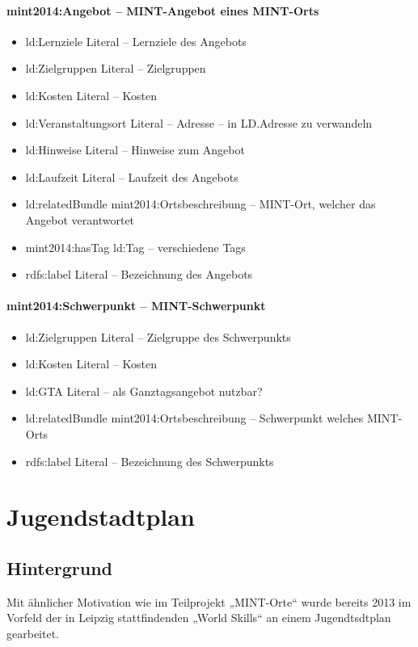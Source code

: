 \documentclass[a4paper,11pt]{article}
\begin{document}
\paragraph{mint2014:Angebot – MINT-Angebot eines MINT-Orts}
\begin{itemize}\itemsep0pt
\item ld:Lernziele Literal – Lernziele des Angebots
\item ld:Zielgruppen Literal – Zielgruppen
\item ld:Kosten Literal – Kosten
\item ld:Veranstaltungsort Literal – Adresse – in LD.Adresse zu verwandeln
\item ld:Hinweise Literal – Hinweise zum Angebot
\item ld:Laufzeit Literal – Laufzeit des Angebots
\item ld:relatedBundle mint2014:Ortsbeschreibung – MINT-Ort, welcher das
  Angebot verantwortet
\item mint2014:hasTag ld:Tag – verschiedene Tags
\item rdfs:label Literal – Bezeichnung des Angebots
\end{itemize}
\paragraph{mint2014:Schwerpunkt – MINT-Schwerpunkt}
\begin{itemize}\itemsep0pt
\item ld:Zielgruppen Literal – Zielgruppe des Schwerpunkts
\item ld:Kosten Literal – Kosten
\item ld:GTA Literal – als Ganztagsangebot nutzbar?
\item ld:relatedBundle mint2014:Ortsbeschreibung – Schwerpunkt welches
  MINT-Orts
\item rdfs:label Literal – Bezeichnung des Schwerpunkts
\end{itemize}
\newpage

\section{Jugendstadtplan}

\subsection{Hintergrund}
Mit ähnlicher Motivation wie im Teilprojekt „MINT-Orte“ wurde bereits 2013 im
Vorfeld der in Leipzig stattfindenden „World Skills“ an einem Jugendtsdtplan
gearbeitet. 
\end{document}
